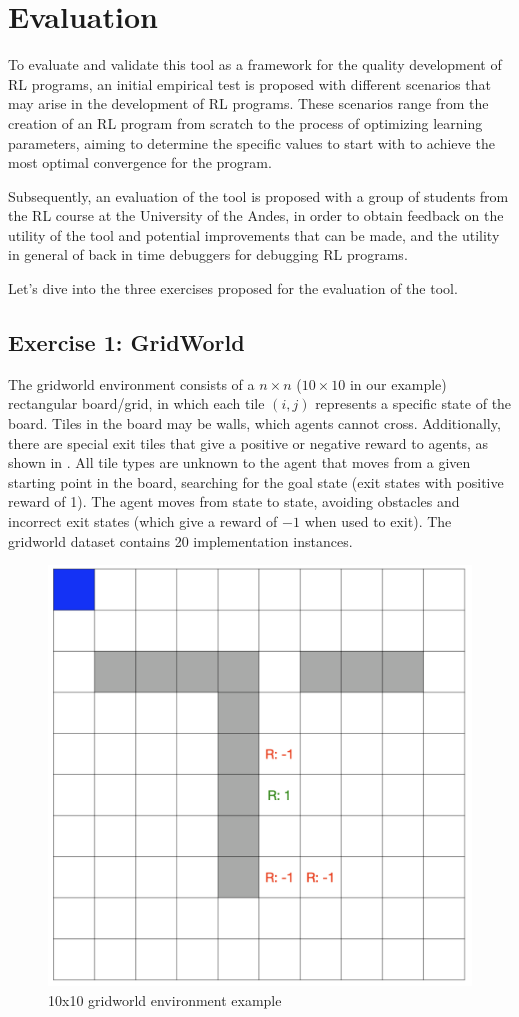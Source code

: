 
\chapter{Evaluation}
\label{cha:evaluation}

To evaluate and validate this tool as a framework for the quality development 
of \ac{RL} programs, an initial empirical test is proposed with different scenarios 
that may arise in the development of \ac{RL} programs. These scenarios range from 
the creation of an \ac{RL} program from scratch to the process of optimizing 
learning parameters, aiming to determine the specific values to start with 
to achieve the most optimal convergence for the program.

Subsequently, an evaluation of the tool is proposed with a group of students 
from the \ac{RL} course at the University of the Andes, in order to obtain 
feedback on the utility of the tool and potential improvements that can be made, 
and the utility in general of back in time debuggers for debugging \ac{RL} programs.

Let's dive into the three exercises proposed for the evaluation of the tool. 

\section{Exercise 1: GridWorld}

The gridworld environment consists of a $n\times n$ ($10\times 10$ in our example) rectangular 
board/grid, in which each tile $(i,j)$ represents a specific state of the board. Tiles in the board may be 
walls, which agents cannot cross. Additionally, there are special exit 
tiles that give a positive or negative reward to agents, as shown in . All tile types 
are unknown to the agent that moves from a given starting point in the board, searching for the goal 
state (\ie exit states with positive reward of 1). The agent moves from state to state, avoiding 
obstacles and incorrect exit states (which give a reward of $-1$ when used to exit). The gridworld 
dataset contains 20 implementation instances. 

\begin{figure}[h]
  \centering
  \includegraphics[width=0.5\columnwidth]{figures/gridworld.png}
  \caption{10x10 gridworld environment example}
  \label{fig:gridworld}
\end{figure}

